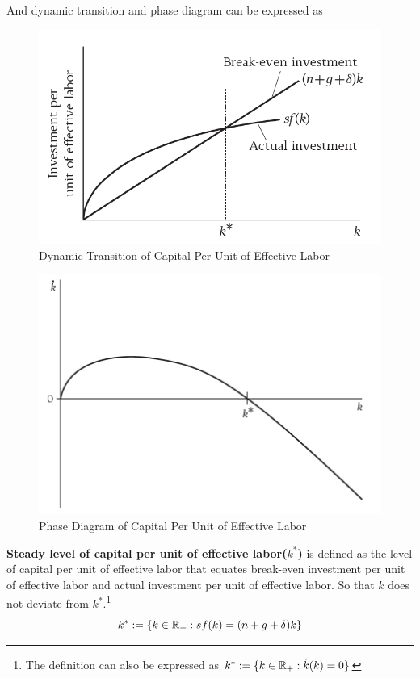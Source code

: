 \documentclass[11pt]{article}
\begin{document}
			\paragraph{} And dynamic transition and phase diagram can be expressed as
			\begin{figure}[h]
				\centering
				\includegraphics[width=0.6\linewidth]{figures/3_1.png}
				\caption{Dynamic Transition of Capital Per Unit of Effective Labor}
			\end{figure}
			
			\begin{figure}[h]
				\centering
				\includegraphics[width=0.6\linewidth]{figures/3_2.png}
				\caption{Phase Diagram of Capital Per Unit of Effective Labor}
			\end{figure}
			
			\newpage 
			
			\begin{definition}
			\textbf{Steady level of capital per unit of effective labor($k^*$)} is defined as the level of capital per unit of effective labor that equates break-even investment per unit of effective labor and actual investment per unit of effective labor. So that $k$ does not deviate from $k^*$.\footnote{The definition can also be expressed as $k^* := \{k \in \mathbb{R}_{+}: \dot{k}(k) = 0\}$}
				\[
					k^* := \{k \in \mathbb{R}_{+}: sf(k) = (n+g+\delta) k\}
				\]
			\end{definition}
			
\end{document}
